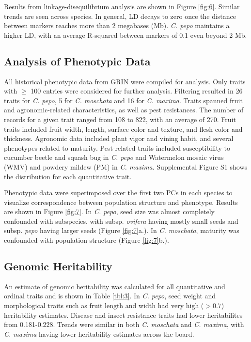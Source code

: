 \documentclass[utf8]{FrontiersinHarvard} %
\begin{document}
Results from linkage-disequilibrium analysis are shown in Figure \ref{fig:6}. Similar trends are seen across species. In general, LD decays to zero once the distance between markers reaches more than 2 megabases (Mb). \textit{C. pepo} maintains a higher LD, with an average R-squared between markers of 0.1 even beyond 2 Mb. 

\subsection{Analysis of Phenotypic Data}
All  historical phenotypic data from GRIN were compiled for analysis. Only traits with $\geq$ 100 entries were considered for further analysis. Filtering resulted in 26 traits for \textit{C. pepo}, 5 for \textit{C. moschata} and 16 for \textit{C. maxima}. Traits spanned fruit and agronomic-related characteristics, as well as pest resistances. The number of records for a given trait ranged from 108 to 822, with an average of  270. Fruit traits included fruit width, length, surface color and texture, and flesh color and thickness. Agronomic data included plant vigor and vining habit, and several phenotypes related to maturity. Pest-related traits included susceptibility to cucumber beetle and squash bug in \textit{C. pepo} and Watermelon mosaic virus (WMV) and powdery mildew (PM) in \textit{C. maxima}. Supplemental Figure S1 shows the distribution for each quantitative trait. 

Phenotypic data were superimposed over the first two PCs in each species to visualize correspondence between population structure and phenotype. Results are shown in Figure \ref{fig:7}. In \textit{C. pepo}, seed size was almost completely confounded with subspecies, with subsp. \textit{ovifera} having mostly small seeds and subsp. \textit{pepo} having larger seeds (Figure \ref{fig:7}a.). In \textit{C. moschata}, maturity was confounded with population structure (Figure \ref{fig:7}b.). 

\subsection{Genomic Heritability}

An estimate of genomic heritability was calculated for all quantitative and ordinal traits and is shown in Table \ref{tbl:3}. In \textit{C. pepo}, seed weight and morphological traits such as fruit length and width had very high ($>0.7$) heritability estimates. Disease and insect resistance traits had lower heritabilites from 0.181-0.228. Trends were similar in both \textit{C. moschata} and \textit{C. maxima}, with \textit{C. maxima} having lower heritability estimates across the board. 
\end{document}

